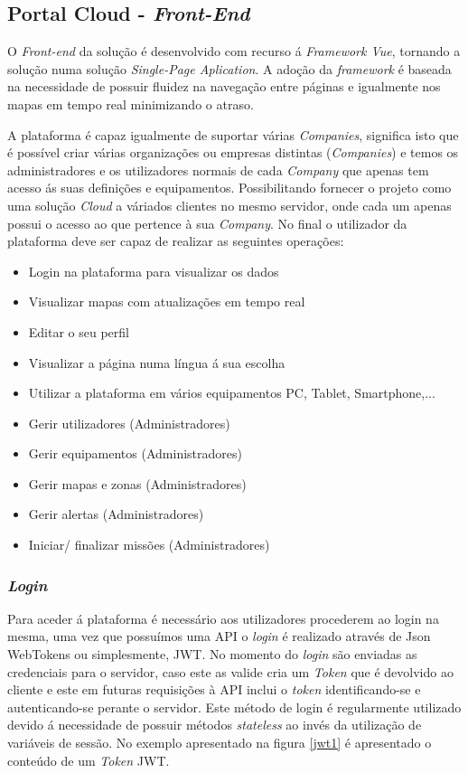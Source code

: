 \subsection {Portal Cloud - \textit{Front-End}}

\par O \textit{Front-end} da solução é desenvolvido com recurso á \textit{Framework Vue}, tornando a solução numa solução \textit{Single-Page Aplication}. A adoção da \textit{framework} é baseada na necessidade de possuir fluidez na navegação entre páginas e igualmente nos mapas em tempo real minimizando o atraso.
\par A plataforma é capaz igualmente de suportar várias \textit{Companies}, significa isto que é possível criar várias organizações ou empresas distintas (\textit{Companies}) e temos os administradores e os utilizadores normais de cada \textit{Company} que apenas tem acesso ás suas definições e equipamentos. Possibilitando fornecer o projeto como uma solução \textit{Cloud} a váriados clientes no mesmo servidor, onde cada um apenas possui o acesso ao que pertence à sua \textit{Company}.
No final o utilizador da plataforma deve ser capaz de realizar as seguintes operações:
\par
\begin{itemize}
\item Login na plataforma para visualizar os dados
\item Visualizar mapas com atualizações em tempo real
\item Editar o seu perfil
\item Visualizar a página numa língua á sua escolha
\item Utilizar a plataforma em vários equipamentos PC, Tablet, Smartphone,...
\item Gerir utilizadores (Administradores)
\item Gerir equipamentos (Administradores)
\item Gerir mapas e zonas (Administradores)
\item Gerir alertas (Administradores)
\item Iniciar/ finalizar missões (Administradores)
\end{itemize}


\subsubsection{\textit{Login}}
\par Para aceder á plataforma é necessário aos utilizadores procederem ao login na mesma, uma vez que possuímos uma API o \textit{login} é realizado através de Json WebTokens ou simplesmente, JWT. No momento do \textit{login} são enviadas as credenciais para o servidor, caso este as valide cria um \textit{Token} que é devolvido ao cliente e este em futuras requisições à API inclui o \textit{token} identificando-se e autenticando-se perante o servidor. Este método de login é regularmente utilizado devido á necessidade de possuir métodos \textit{stateless} ao invés da utilização de variáveis de sessão. No exemplo apresentado na figura \ref{jwt1} é apresentado o conteúdo de um \textit{Token} JWT. 


